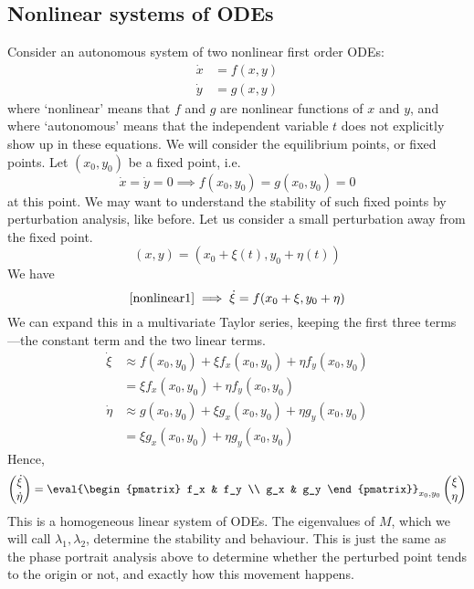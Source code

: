 \subsection{Nonlinear systems of ODEs}
Consider an autonomous system of two nonlinear first order ODEs:
\begin{align}
	\label{nonlinear1} \dot x & = f(x, y) \\
	\label{nonlinear2} \dot y & = g(x, y)
\end{align}
where `nonlinear' means that \(f\) and \(g\) are nonlinear functions of \(x\) and \(y\), and where `autonomous' means that the independent variable \(t\) does not explicitly show up in these equations.
We will consider the equilibrium points, or fixed points.
Let \((x_0, y_0)\) be a fixed point, i.e.
\[
	\dot x = \dot y = 0 \implies f(x_0, y_0) = g(x_0, y_0) = 0
\]
at this point.
We may want to understand the stability of such fixed points by perturbation analysis, like before.
Let us consider a small perturbation away from the fixed point.
\[
	(x, y) = (x_0 + \xi(t), y_0 + \eta(t))
\]
We have
\[
	\eqref{nonlinear1} \implies \dot \xi = f(x_0 + \xi, y_0 + \eta)
\]
We can expand this in a multivariate Taylor series, keeping the first three terms---the constant term and the two linear terms.
\begin{align*}
	\dot \xi  & \approx f(x_0, y_0) + \xi f_x(x_0, y_0) + \eta f_y(x_0, y_0) \\
	          & = \xi f_x(x_0, y_0) + \eta f_y(x_0, y_0)                     \\
	\dot \eta & \approx g(x_0, y_0) + \xi g_x(x_0, y_0) + \eta g_y(x_0, y_0) \\
	          & = \xi g_x(x_0, y_0) + \eta g_y(x_0, y_0)
\end{align*}
Hence,
\[
	\begin{pmatrix}
		\dot \xi \\ \dot \eta
	\end{pmatrix} = \eval{\begin{pmatrix}
			f_x & f_y \\ g_x & g_y
		\end{pmatrix}}_{x_0, y_0} \begin{pmatrix}
		\xi \\ \eta
	\end{pmatrix}
\]
This is a homogeneous linear system of ODEs.
The eigenvalues of \(M\), which we will call \(\lambda_1, \lambda_2\), determine the stability and behaviour.
This is just the same as the phase portrait analysis above to determine whether the perturbed point tends to the origin or not, and exactly how this movement happens.

